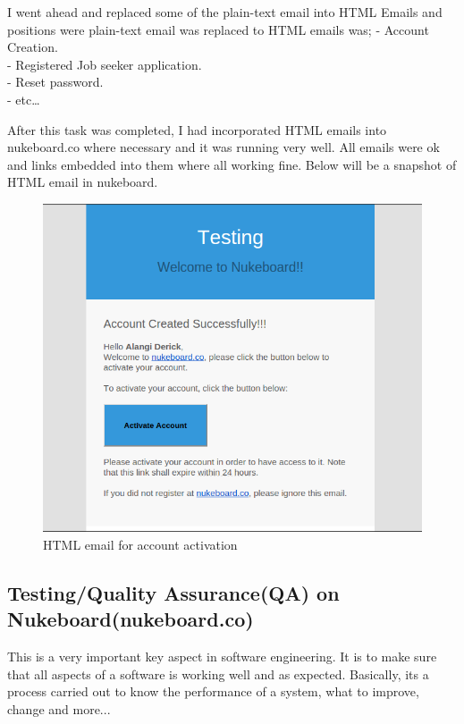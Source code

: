 I went ahead and replaced some of the plain-text email into HTML Emails and positions were plain-text email was replaced to HTML emails was;
- Account Creation. \\
- Registered Job seeker application. \\
- Reset password. \\
- etc\ldots

After this task was completed, I had incorporated HTML emails into nukeboard.co where necessary and it was running very well. All emails were ok and links embedded into them where all working fine. Below will be a snapshot of HTML email in nukeboard.

\begin{figure}[h]
\centering
\includegraphics[width=13cm,scale=1.5]{Figures/HTMLEmail}
\decoRule
\caption[HTML Email]{HTML email for account activation}
\label{fig:HTMLEmail}
\end{figure} 

\subsection{Testing/Quality Assurance(QA) on Nukeboard(nukeboard.co)}

This is a very important key aspect in software engineering. It is to make sure that all aspects of a software is working well and as expected. Basically, its a process carried out to know the performance of a system, what to improve, change and more... \\

